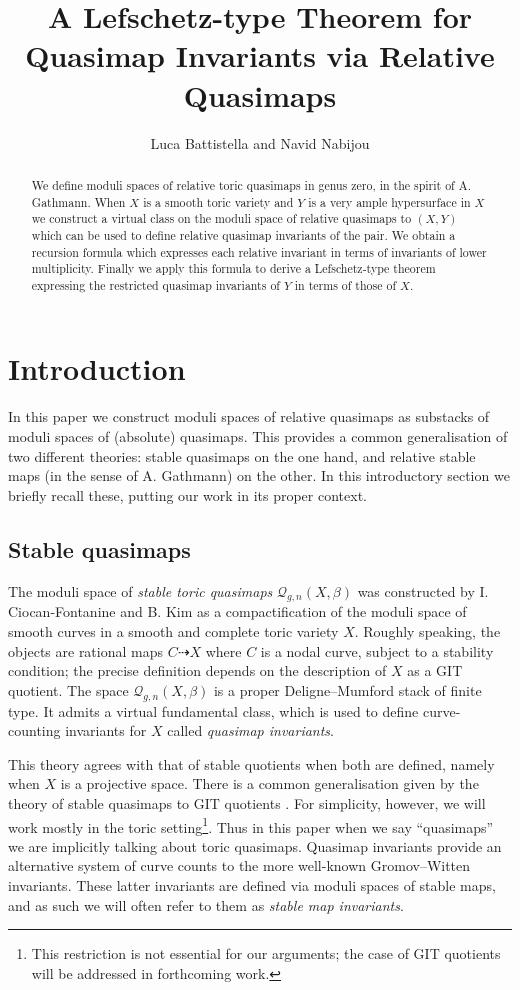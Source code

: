 \documentclass[11pt]{amsart}
\title[Quasimap Lefschetz via Relative Quasimaps]{A Lefschetz-type Theorem for Quasimap Invariants via Relative Quasimaps}
\author{Luca Battistella and Navid Nabijou}
\newcommand{\Q}[4]{\mathcal{Q}_{#1,#2}(#3,#4)}
\theoremstyle{definition}
\theoremstyle{definition}
\newcommand{\ilemph}[1]{\emph{#1}}
\begin{document}
\begin{abstract} We define moduli spaces of relative toric quasimaps in genus zero, in the spirit of A. Gathmann. When $X$ is a smooth toric variety and $Y$ is a very ample hypersurface in $X$ we construct a virtual class on the moduli space of relative quasimaps to $(X,Y)$ which can be used to define relative quasimap invariants of the pair. We obtain a recursion formula which expresses each relative invariant in terms of invariants of lower multiplicity. Finally we apply this formula to derive a Lefschetz-type theorem expressing the restricted quasimap invariants of $Y$ in terms of those of $X$. \end{abstract}

\maketitle
\appendixtitletocoff
\tableofcontents

\section{Introduction}
In this paper we construct moduli spaces of relative quasimaps as substacks of moduli spaces of (absolute) quasimaps. This provides a common generalisation of two different theories: stable quasimaps on the one hand, and relative stable maps (in the sense of A. Gathmann) on the other. In this introductory section we briefly recall these, putting our work in its proper context.

\subsection{Stable quasimaps}
The moduli space of \ilemph{stable toric quasimaps} $\Q{g}{n}{X}{\beta}$ was constructed by I. Ciocan-Fontanine and B. Kim \cite{CF-K} as a compactification of the moduli space of smooth curves in a smooth and complete toric variety $X$. Roughly speaking, the objects are rational maps $C \dashrightarrow X$ where $C$ is a nodal curve, subject to a stability condition; the precise definition depends on the description of $X$ as a GIT quotient.  The space $\Q{g}{n}{X}{\beta}$ is a proper Deligne--Mumford stack of finite type.  It admits a virtual fundamental class, which is used to define curve-counting invariants for $X$ called \ilemph{quasimap invariants}.

This theory agrees with that of stable quotients \cite{MOP} when both are defined, namely when $X$ is a projective space.  There is a common generalisation given by the theory of stable quasimaps to GIT quotients \cite{CFKM}. For simplicity, however, we will work mostly in the toric setting\footnote{This restriction is not essential for our arguments; the case of GIT quotients will be addressed in forthcoming work.}. Thus in this paper when we say ``quasimaps'' we are implicitly talking about toric quasimaps.
Quasimap invariants provide an alternative system of curve counts to the more well-known Gromov--Witten invariants. These latter invariants are defined via moduli spaces of stable maps, and as such we will often refer to them as \emph{stable map invariants}.
\end{document}

